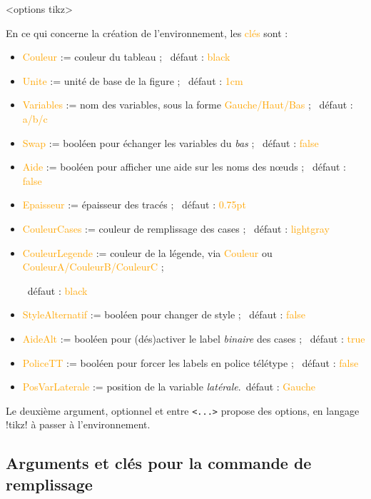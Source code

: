 \documentclass[french,a4paper,11pt]{article}
\newcommand\Cle[1]{{\small\sffamily\textlangle \textcolor{orange}{#1}\textrangle}}
\begin{document}
{{\begin{DemoCode}
\begin{TableKarnaugh}[clés]<options tikz>
\end{TableKarnaugh}
\end{DemoCode}

\begin{tipblock}
En ce qui concerne la création de l'environnement, les \Cle{clés} sont :

\begin{itemize}
	\item \Cle{Couleur} := couleur du tableau ; \hfill~défaut : \Cle{black}
	\item \Cle{Unite} := unité de base de la figure ; \hfill~défaut : \Cle{1cm}
	\item \Cle{Variables} := nom des variables, sous la forme \Cle{Gauche/Haut/Bas} ; \hfill~défaut : \Cle{a/b/c}
	\item \Cle{Swap} := booléen pour échanger les variables du \textit{bas} ; \hfill~défaut : \Cle{false}
	\item \Cle{Aide} := booléen pour afficher une aide sur les noms des nœuds ; \hfill~défaut : \Cle{false}
	\item \Cle{Epaisseur} := épaisseur des tracés ; \hfill~défaut : \Cle{0.75pt}
	\item \Cle{CouleurCases} := couleur de remplissage des cases ; \hfill~défaut : \Cle{lightgray}
	\item \Cle{CouleurLegende} := couleur de la légende, via \Cle{Couleur} ou \Cle{CouleurA/CouleurB/CouleurC} ;
	
	\hfill~défaut : \Cle{black}
	\item \Cle{StyleAlternatif} := booléen pour changer de style ; \hfill~défaut : \Cle{false}
	\item \Cle{AideAlt} := booléen pour (dés)activer le label \textit{binaire} des cases ; \hfill~défaut : \Cle{true}
	\item \Cle{PoliceTT} := booléen pour forcer les labels en police télétype ; \hfill~défaut : \Cle{false}
	\item \Cle{PosVarLaterale} := position de la variable \textit{latérale}.\hfill~défaut : \Cle{Gauche}
\end{itemize}

Le deuxième argument, optionnel et entre \texttt{<...>} propose des options, en langage \packagetex!tikz! à passer à l'environnement.
\end{tipblock}

\subsection{Arguments et clés pour la commande de remplissage}

}}
\end{document}
